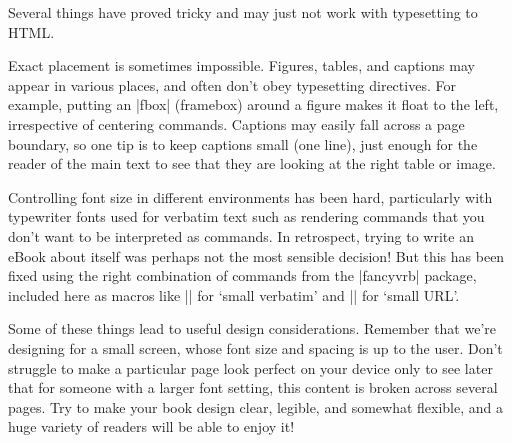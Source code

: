 Several things have proved tricky and may just not work with typesetting to HTML.

Exact placement is sometimes impossible. Figures, tables, and captions may appear
in various places, and often don't obey \tex typesetting directives. For example,
putting an \sverb|fbox| (framebox) around a figure makes it float to the left, irrespective of
centering commands. Captions may easily fall across
a page boundary, so one tip is to keep captions small (one line), just enough for the reader
of the main text to see that they are looking at the right table or image.

Controlling font size in different environments has been hard, particularly with typewriter fonts
used for verbatim text such as rendering \latex commands that you don't want to be interpreted as
\latex commands. In retrospect, trying to write an eBook about \latex itself was perhaps not the
most sensible decision! But this has been fixed using the right combination of commands from the
\sverb|fancyvrb| package, included here as macros like \sverb|\sverb| for `small verbatim' and
\sverb|\surl| for `small URL'.

Some of these things lead to useful design considerations.
Remember that we're designing for a small screen, whose font size and spacing is up to the user. 
Don't struggle to make a particular page look perfect on your device
only to see later that for someone with a larger font setting, this content is broken across
several pages. Try to make your book design clear, legible,
and somewhat flexible, and a huge variety of readers will be able to enjoy it!

